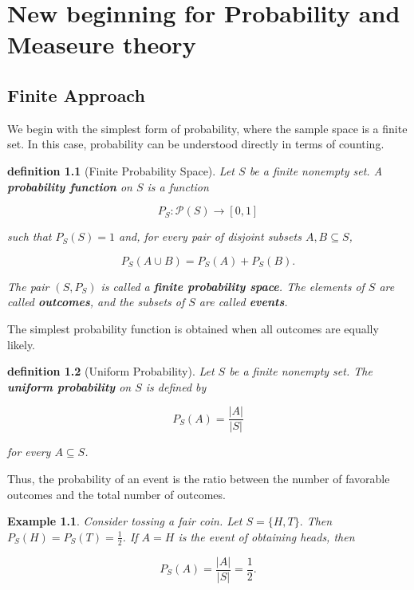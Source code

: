 \documentclass[10pt,a4paper]{book}
\newtheorem{definition}{definition}[section]
\newtheorem{example}{Example}[section]
\begin{document}
\chapter{New beginning for Probability and Measeure theory}

\section{Finite Approach}

We begin with the simplest form of probability, where the sample space is a finite set. In this case, probability can be understood directly in terms of counting.

\begin{definition}[Finite Probability Space]
    Let $S$ be a finite nonempty set. A \textbf{probability function} on $S$ is a function

    $$
        P_S:\mathcal{P}(S)\to[0,1]
    $$

    such that $P_S(S)=1$ and, for every pair of disjoint subsets $A,B\subseteq S$,

    $$
        P_S(A\cup B)=P_S(A)+P_S(B).
    $$

    The pair $(S,P_S)$ is called a \textbf{finite probability space}. The elements of $S$ are called \textbf{outcomes}, and the subsets of $S$ are called \textbf{events}.
\end{definition}

The simplest probability function is obtained when all outcomes are equally likely.

\begin{definition}[Uniform Probability]
    Let $S$ be a finite nonempty set. The \textbf{uniform probability} on $S$ is defined by

    $$
        P_S(A)=\frac{|A|}{|S|}
    $$

    for every $A\subseteq S$.
\end{definition}

Thus, the probability of an event is the ratio between the number of favorable outcomes and the total number of outcomes.

\begin{example}
    Consider tossing a fair coin. Let
    $
        S=\{H,T\}.
    $
    Then $P_S({H})=P_S({T})=\frac12$. If $A={H}$ is the event of obtaining heads, then

    $$
        P_S(A)=\frac{|A|}{|S|}=\frac12.
    $$

\end{example}
\end{document}
